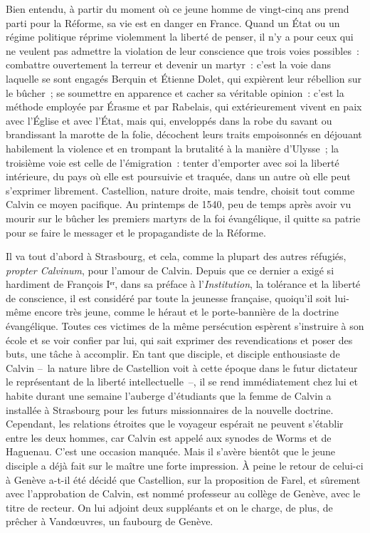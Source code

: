 \documentclass[french,twoside]{book} %
\newcommand\foreign[1]{\emph{#1}}
\begin{document}
Bien entendu, à partir du moment où ce jeune homme de vingt-cinq ans prend parti pour la Réforme, sa vie est en danger en France. Quand un État ou un régime politique réprime violemment la liberté de penser, il n’y a pour ceux qui ne veulent pas admettre la violation de leur conscience que trois voies possibles : combattre ouvertement la terreur et devenir un martyr : c’est la voie dans laquelle se sont engagés Berquin et Étienne Dolet, qui expièrent leur rébellion sur le bûcher ; se soumettre en apparence et cacher sa véritable opinion : c’est la méthode employée par Érasme et par Rabelais, qui extérieurement vivent en paix avec l’Église et avec l’État, mais qui, enveloppés dans la robe du savant ou brandissant la marotte de la folie, décochent leurs traits empoisonnés en déjouant habilement la violence et en trompant la brutalité à la manière d’Ulysse ; la troisième voie est celle de l’émigration : tenter d’emporter avec soi la liberté intérieure, du pays où elle est poursuivie et traquée, dans un autre où elle peut s’exprimer librement. Castellion, nature droite, mais tendre, choisit tout comme Calvin ce moyen pacifique. Au printemps de 1540, peu de temps après avoir vu mourir sur le bûcher les premiers martyrs de la foi évangélique, il quitte sa patrie pour se faire le messager et le propagandiste de la Réforme.\par
Il va tout d’abord à Strasbourg, et cela, comme la plupart des autres réfugiés, \foreign{propter Calvinum}, pour l’amour de Calvin. Depuis que ce dernier a exigé si hardiment de François Iᵉʳ, dans sa préface à l’\emph{Institution}, la tolérance et la liberté de conscience, il est considéré par toute la jeunesse française, quoiqu’il soit lui-même encore très jeune, comme le héraut et le porte-bannière de la doctrine évangélique. Toutes ces victimes de la même persécution espèrent s’instruire à son école et se voir confier par lui, qui sait exprimer des revendications et poser des buts, une tâche à accomplir. En tant que disciple, et disciple enthousiaste de Calvin – la nature libre de Castellion voit à cette époque dans le futur dictateur le représentant de la liberté intellectuelle –, il se rend immédiatement chez lui et habite durant une semaine l’auberge d’étudiants que la femme de Calvin a installée à Strasbourg pour les futurs missionnaires de la nouvelle doctrine. Cependant, les relations étroites que le voyageur espérait ne peuvent s’établir entre les deux hommes, car Calvin est appelé aux synodes de Worms et de Haguenau. C’est une occasion manquée. Mais il s’avère bientôt que le jeune disciple a déjà fait sur le maître une forte impression. À peine le retour de celui-ci à Genève a-t-il été décidé que Castellion, sur la proposition de Farel, et sûrement avec l’approbation de Calvin, est nommé professeur au collège de Genève, avec le titre de recteur. On lui adjoint deux suppléants et on le charge, de plus, de prêcher à Vandœuvres, un faubourg de Genève.\par
\end{document}
